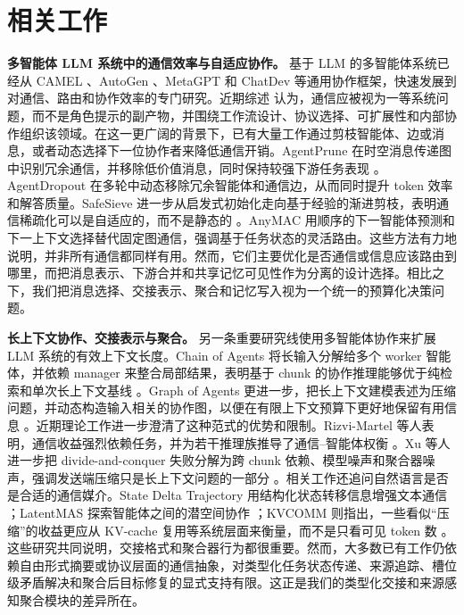 \documentclass{article} %
\begin{document}
\section{相关工作}
\label{sec:related}
\textbf{多智能体 LLM 系统中的通信效率与自适应协作。}
基于 LLM 的多智能体系统已经从 CAMEL \cite{li2023camel}、AutoGen \cite{wu2023autogen}、MetaGPT \cite{hong2024metagpt} 和 ChatDev \cite{qian2024chatdev} 等通用协作框架，快速发展到对通信、路由和协作效率的专门研究。近期综述 \cite{li2024llmmas_survey,yan2025beyondselftalk} 认为，通信应被视为一等系统问题，而不是角色提示的副产物，并围绕工作流设计、协议选择、可扩展性和内部协作组织该领域。在这一更广阔的背景下，已有大量工作通过剪枝智能体、边或消息，或者动态选择下一位协作者来降低通信开销。AgentPrune 在时空消息传递图中识别冗余通信，并移除低价值消息，同时保持较强下游任务表现 \cite{zhang2025agentprune}。AgentDropout \cite{wang2025agentdropout} 在多轮中动态移除冗余智能体和通信边，从而同时提升 token 效率和解答质量。SafeSieve 进一步从启发式初始化走向基于经验的渐进剪枝，表明通信稀疏化可以是自适应的，而不是静态的 \cite{zhang2025safesieve}。AnyMAC \cite{wang2025anymac} 用顺序的下一智能体预测和下一上下文选择替代固定图通信，强调基于任务状态的灵活路由。这些方法有力地说明，并非所有通信都同样有用。然而，它们主要优化是否通信或信息应该路由到哪里，而把消息表示、下游合并和共享记忆可见性作为分离的设计选择。相比之下，我们把消息选择、交接表示、聚合和记忆写入视为一个统一的预算化决策问题。

\textbf{长上下文协作、交接表示与聚合。}
另一条重要研究线使用多智能体协作来扩展 LLM 系统的有效上下文长度。Chain of Agents 将长输入分解给多个 worker 智能体，并依赖 manager 来整合局部结果，表明基于 chunk 的协作推理能够优于纯检索和单次长上下文基线 \cite{zhang2024chainofagents}。Graph of Agents 更进一步，把长上下文建模表述为压缩问题，并动态构造输入相关的协作图，以便在有限上下文预算下更好地保留有用信息 \cite{joo2025graphofagents}。近期理论工作进一步澄清了这种范式的优势和限制。Rizvi-Martel 等人表明，通信收益强烈依赖任务，并为若干推理族推导了通信--智能体权衡 \cite{rizvimartel2026benefits}。Xu 等人进一步把 divide-and-conquer 失败分解为跨 chunk 依赖、模型噪声和聚合器噪声，强调发送端压缩只是长上下文问题的一部分 \cite{xu2026divideconquer}。相关工作还追问自然语言是否是合适的通信媒介。State Delta Trajectory 用结构化状态转移信息增强文本通信 \cite{tang2025sde}；LatentMAS 探索智能体之间的潜空间协作 \cite{zou2025latentmas}；KVCOMM 则指出，一些看似“压缩”的收益更应从 KV-cache 复用等系统层面来衡量，而不是只看可见 token 数 \cite{ye2025kvcomm}。这些研究共同说明，交接格式和聚合器行为都很重要。然而，大多数已有工作仍依赖自由形式摘要或协议层面的通信抽象，对类型化任务状态传递、来源追踪、槽位级矛盾解决和聚合后目标修复的显式支持有限。这正是我们的类型化交接和来源感知聚合模块的差异所在。
\end{document}
